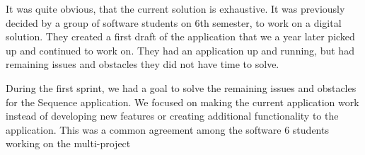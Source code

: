 It was quite obvious, that the current solution is exhaustive. It was previously decided by a group of software students on 6th semester, to work on a digital solution. They created a first draft of the application that we a year later picked up and continued to work on. They had an application up and running, but had remaining issues and obstacles they did not have time to solve.

During the first sprint, we had a goal to solve the remaining issues and obstacles for the Sequence application. We focused on making the current application work instead of developing new features or creating additional functionality to the application. This was a common agreement among the software 6 students working on the multi-project




